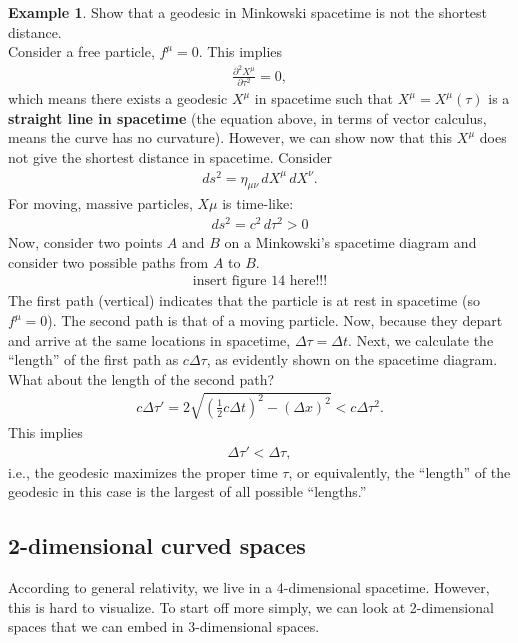 \documentclass{article}
\theoremstyle{definition}
\newtheorem{exmp}{Example}[section]
\begin{document}
\begin{exmp}
	Show that a geodesic in Minkowski spacetime is not the shortest distance. \\
	
	Consider a free particle, $f^\mu = 0$. This implies
	\begin{align*}
	\frac{\partial^2 X^\mu}{\partial \tau^2} = 0,
	\end{align*}
	which means there exists a geodesic $X^\mu$ in spacetime such that $X^\mu = X^\mu(\tau)$ is a \textbf{straight line in spacetime} (the equation above, in terms of vector calculus, means the curve has no curvature). However, we can show now that this $X^\mu$ does not give the shortest distance in spacetime. Consider
	\begin{align*}
	ds^2 = \eta_{\mu\nu}\,dX^\mu\,dX^\nu.
	\end{align*}
	For moving, massive particles, $X\mu$ is time-like: 
	\begin{align*}
	ds^2 = c^2\,d\tau^2 > 0
	\end{align*}
	Now, consider two points $A$ and $B$ on a Minkowski's spacetime diagram and consider two possible paths from $A$ to $B$.
	\begin{align*}
	\text{insert figure 14 here!!!}
	\end{align*}
	The first path (vertical) indicates that the particle is at rest in spacetime (so $f^\mu = 0$). The second path is that of a moving particle. Now, because they depart and arrive at the same locations in spacetime, $\Delta\tau = \Delta t$. Next, we calculate the ``length'' of the first path as $c\Delta \tau$, as evidently shown on the spacetime diagram. What about the length of the second path?
	\begin{align*}
	c\Delta \tau' = 2\sqrt{\left( \frac{1}{2}c\Delta t \right)^2  - \left( \Delta x \right)^2  } < c\Delta\tau^2.
	\end{align*}
	This implies
	\begin{align*}
	\Delta \tau' < \Delta \tau,
	\end{align*}
	i.e., the geodesic maximizes the proper time $\tau$, or equivalently, the ``length'' of the geodesic in this case is the largest of all possible ``lengths.'' 
\end{exmp} 
\subsection{2-dimensional curved spaces}
According to general relativity, we live in a 4-dimensional spacetime. However, this is hard to visualize. To start off more simply, we can look at 2-dimensional spaces that we can embed in 3-dimensional spaces.\\
\end{document}

